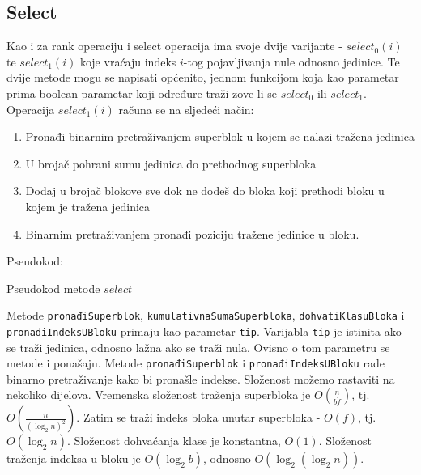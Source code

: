 \documentclass[times, utf8, seminar, numeric]{fer}
\begin{document}
\subsection{Select}
Kao i za rank operaciju i select operacija ima svoje dvije varijante - $select_0(i)$ te $select_1(i)$ koje vraćaju indeks $i$-tog pojavljivanja nule odnosno jedinice. Te dvije metode mogu se napisati općenito, jednom funkcijom koja kao parametar prima boolean parametar koji određure traži zove li se $select_0$ ili $select_1$.
Operacija $select_1(i)$ računa se na sljedeći način:
\begin{enumerate}
	\item Pronađi binarnim pretraživanjem superblok u kojem se nalazi tražena jedinica
	\item U brojač pohrani sumu jedinica do prethodnog superbloka
	\item Dodaj u brojač blokove sve dok ne dođeš do bloka koji prethodi bloku u kojem je tražena jedinica
	\item Binarnim pretraživanjem pronađi poziciju tražene jedinice u bloku.
\end{enumerate}
Pseudokod:

\begin{algorithm}[H]
 \caption{Pseudokod metode $select$}
\end{algorithm}

Metode \texttt{pronađiSuperblok}, \texttt{kumulativnaSumaSuperbloka}, \texttt{dohvatiKlasuBloka} i \texttt{pronađiIndeksUBloku} primaju kao parametar \texttt{tip}. Varijabla \texttt{tip} je istinita ako se traži jedinica, odnosno lažna ako se traži nula. Ovisno o tom parametru se metode i ponašaju. Metode \texttt{pronađiSuperblok} i \texttt{pronađiIndeksUBloku} rade binarno pretraživanje kako bi pronašle indekse.
Složenost možemo rastaviti na nekoliko dijelova. Vremenska složenost traženja superbloka je $O(\frac{n}{b \dot f})$, tj. $O(\frac{n}{(\log_2n)^2})$. Zatim se traži indeks bloka unutar superbloka - $O(f)$, tj. $O(\log_2n)$. Složenost dohvaćanja klase je konstantna, $O(1)$. Složenost traženja indeksa u bloku je $O(\log_2b)$, odnosno $O(\log_2(\log_2n))$.
\end{document}

